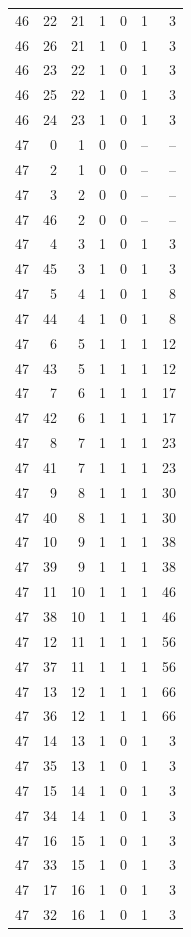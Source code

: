 \begin{longtable}{rrrrrrr}
46 & 22 & 21 & 1 & 0 & 1 & 3\\
46 & 26 & 21 & 1 & 0 & 1 & 3\\
46 & 23 & 22 & 1 & 0 & 1 & 3\\
46 & 25 & 22 & 1 & 0 & 1 & 3\\
46 & 24 & 23 & 1 & 0 & 1 & 3\\
47 & 0 & 1 & 0 & 0 & -- & --\\
47 & 2 & 1 & 0 & 0 & -- & --\\
47 & 3 & 2 & 0 & 0 & -- & --\\
47 & 46 & 2 & 0 & 0 & -- & --\\
47 & 4 & 3 & 1 & 0 & 1 & 3\\
47 & 45 & 3 & 1 & 0 & 1 & 3\\
47 & 5 & 4 & 1 & 0 & 1 & 8\\
47 & 44 & 4 & 1 & 0 & 1 & 8\\
47 & 6 & 5 & 1 & 1 & 1 & 12\\
47 & 43 & 5 & 1 & 1 & 1 & 12\\
47 & 7 & 6 & 1 & 1 & 1 & 17\\
47 & 42 & 6 & 1 & 1 & 1 & 17\\
47 & 8 & 7 & 1 & 1 & 1 & 23\\
47 & 41 & 7 & 1 & 1 & 1 & 23\\
47 & 9 & 8 & 1 & 1 & 1 & 30\\
47 & 40 & 8 & 1 & 1 & 1 & 30\\
47 & 10 & 9 & 1 & 1 & 1 & 38\\
47 & 39 & 9 & 1 & 1 & 1 & 38\\
47 & 11 & 10 & 1 & 1 & 1 & 46\\
47 & 38 & 10 & 1 & 1 & 1 & 46\\
47 & 12 & 11 & 1 & 1 & 1 & 56\\
47 & 37 & 11 & 1 & 1 & 1 & 56\\
47 & 13 & 12 & 1 & 1 & 1 & 66\\
47 & 36 & 12 & 1 & 1 & 1 & 66\\
47 & 14 & 13 & 1 & 0 & 1 & 3\\
47 & 35 & 13 & 1 & 0 & 1 & 3\\
47 & 15 & 14 & 1 & 0 & 1 & 3\\
47 & 34 & 14 & 1 & 0 & 1 & 3\\
47 & 16 & 15 & 1 & 0 & 1 & 3\\
47 & 33 & 15 & 1 & 0 & 1 & 3\\
47 & 17 & 16 & 1 & 0 & 1 & 3\\
47 & 32 & 16 & 1 & 0 & 1 & 3\\

\end{longtable}
